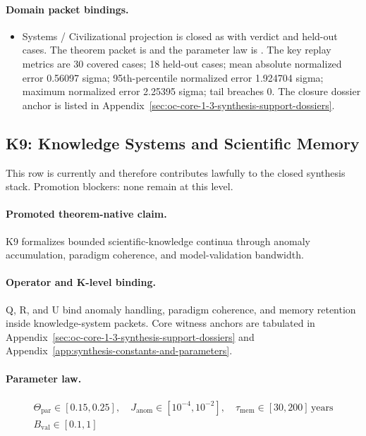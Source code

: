 \paragraph{Domain packet bindings.}
\begin{itemize}[leftmargin=1.6em,nosep]
\item Systems / Civilizational projection is closed as  with verdict  and  held-out cases. The theorem packet is  and the parameter law is . The key replay metrics are 30 covered cases; 18 held-out cases; mean absolute normalized error 0.56097 sigma; 95th-percentile normalized error 1.924704 sigma; maximum normalized error 2.25395 sigma; tail breaches 0. The closure dossier anchor is listed in Appendix~\ref{sec:oc-core-1-3-synthesis-support-dossiers}.
\end{itemize}

\subsection{K9: Knowledge Systems and Scientific Memory}
\label{sec:oc-core-1-3-synthesis-k9}
This row is currently  and therefore contributes lawfully to the closed synthesis stack.
Promotion blockers: none remain at this level.

\paragraph{Promoted theorem-native claim.}
K9 formalizes bounded scientific-knowledge continua through anomaly accumulation, paradigm coherence, and model-validation bandwidth.

\paragraph{Operator and K-level binding.}
Q, R, and U bind anomaly handling, paradigm coherence, and memory retention inside knowledge-system packets.
Core witness anchors are tabulated in Appendix~\ref{sec:oc-core-1-3-synthesis-support-dossiers} and Appendix~\ref{app:synthesis-constants-and-parameters}.

\paragraph{Parameter law.}
\[
\begin{gathered} \Theta_{\mathrm{par}} \in [0.15,0.25],\quad J_{\mathrm{anom}} \in [10^{-4},10^{-2}],\quad \tau_{\mathrm{mem}} \in [30,200]\,\mathrm{years} \\ B_{\mathrm{val}} \in [0.1,1] \end{gathered}
\]

